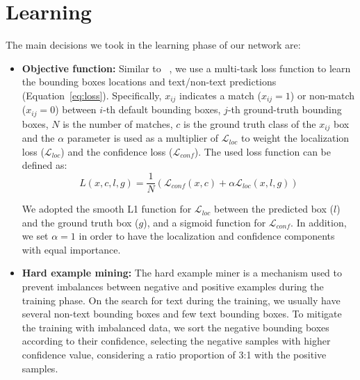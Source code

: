 \section{Learning}

The main decisions we took in the learning phase of our network are:

\begin{itemize}

\item  {\bf Objective function:}
Similar to ~\cite{Liu2016ECCV}, we use a multi-task loss function to learn the bounding boxes locations and text/non-text predictions (Equation~\ref{eq:loss}). Specifically, $x_{ij}$ indicates a match ($x_{ij} = 1$) or non-match ($x_{ij} = 0$) between $i$-th default bounding boxes, $j$-th ground-truth bounding boxes, $N$ is the number of matches, $c$ is the ground truth class of the $x_{ij}$ box and the $\alpha$ parameter is used as a multiplier of $\mathcal{L}_{loc}$ to weight the localization loss ($\mathcal{L}_{loc}$) and the confidence loss ($\mathcal{L}_{conf}$). The used loss function can be defined as:
%
\begin{equation}
    L(x,c,l,g) = \frac{1}{N} (\mathcal{L}_{conf}(x,c) + \alpha \mathcal{L}_{loc}(x, l, g))
    \label{eq:loss}
\end{equation}

We adopted the smooth L1 function for $\mathcal{L}_{loc}$ between the predicted box ($l$) and the ground truth box ($g$), and a sigmoid function for $\mathcal{L}_{conf}$. In addition, we set $\alpha=1$ in order to have the localization and confidence components with equal importance.

\item {\bf Hard example mining:}
The hard example miner is a mechanism used to prevent imbalances between negative and positive examples during the training phase. On the search for text during the training, we usually have several non-text bounding boxes and few text bounding boxes. To mitigate the training with imbalanced data, we sort the negative bounding boxes according to their confidence, selecting the negative samples with higher confidence value, considering a ratio proportion of 3:1 with the positive samples.

\end{itemize}



